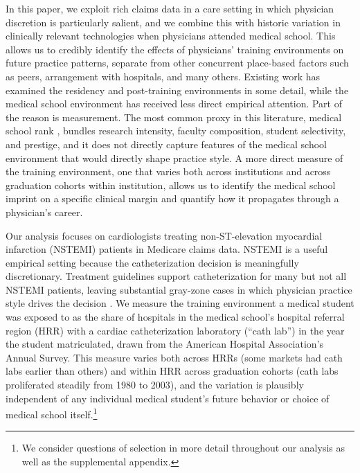 \documentclass[12pt]{article}
\begin{document}
In this paper, we exploit rich claims data in a care setting in which physician discretion is particularly salient, and we combine this with historic variation in clinically relevant technologies when physicians attended medical school. This allows us to credibly identify the effects of physicians' training environments on future practice patterns, separate from other concurrent place-based factors such as peers, arrangement with hospitals, and many others. Existing work has examined the residency and post-training environments in some detail, while the medical school environment has received less direct empirical attention. Part of the reason is measurement. The most common proxy in this literature, medical school rank \citep{schnell2018, doyle_jr_returns_2010}, bundles research intensity, faculty composition, student selectivity, and prestige, and it does not directly capture features of the medical school environment that would directly shape practice style. A more direct measure of the training environment, one that varies both across institutions and across graduation cohorts within institution, allows us to identify the medical school imprint on a specific clinical margin and quantify how it propagates through a physician's career.

Our analysis focuses on cardiologists treating non-ST-elevation myocardial infarction (NSTEMI) patients in Medicare claims data. NSTEMI is a useful empirical setting because the catheterization decision is meaningfully discretionary. Treatment guidelines support catheterization for many but not all NSTEMI patients, leaving substantial gray-zone cases in which physician practice style drives the decision \citep{chan2011, amsterdam2014}. We measure the training environment a medical student was exposed to as the share of hospitals in the medical school's hospital referral region (HRR) with a cardiac catheterization laboratory (``cath lab'') in the year the student matriculated, drawn from the American Hospital Association's Annual Survey. This measure varies both across HRRs (some markets had cath labs earlier than others) and within HRR across graduation cohorts (cath labs proliferated steadily from 1980 to 2003), and the variation is plausibly independent of any individual medical student's future behavior or choice of medical school itself.\footnote{We consider questions of selection in more detail throughout our analysis as well as the supplemental appendix.}
\end{document}
